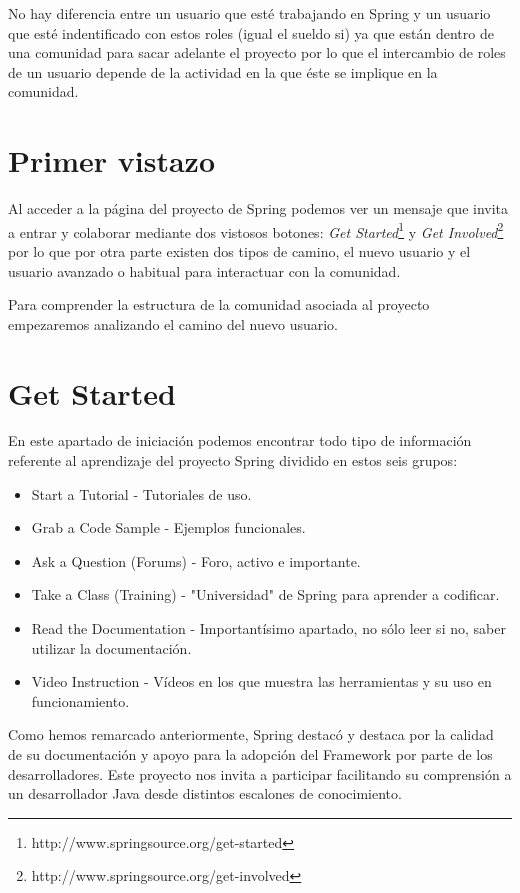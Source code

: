 \documentclass[11pt]{scrartcl}
\begin{document}
No hay diferencia entre un usuario que esté trabajando en Spring y un usuario que esté indentificado con estos roles (igual el sueldo si) ya que están dentro de una comunidad para sacar adelante el proyecto por lo que el intercambio de roles de un usuario depende de la actividad en la que éste se implique en la comunidad.

\section{Primer vistazo}

Al acceder a la página del proyecto de Spring podemos ver un mensaje que invita a entrar y colaborar mediante dos vistosos botones: \emph{Get Started}\footnote{http://www.springsource.org/get-started} y \emph{Get Involved}\footnote{http://www.springsource.org/get-involved} por lo que por otra parte existen dos tipos de camino, el nuevo usuario y el usuario avanzado o habitual para interactuar con la comunidad.

Para comprender la estructura de la comunidad asociada al proyecto empezaremos analizando el camino del nuevo usuario.

\section{Get Started}

En este apartado de iniciación podemos encontrar todo tipo de información referente al aprendizaje del proyecto Spring dividido en estos seis grupos:

\begin{itemize}
    \item Start a Tutorial - Tutoriales de uso.
    \item Grab a Code Sample - Ejemplos funcionales.
    \item Ask a Question (Forums) - Foro, activo e importante.
    \item Take a Class (Training) - "Universidad" de Spring para aprender a codificar.
    \item Read the Documentation - Importantísimo apartado, no sólo leer si no, saber utilizar la documentación.
    \item Video Instruction - Vídeos en los que muestra las herramientas y su uso en funcionamiento.
\end{itemize}

Como hemos remarcado anteriormente, Spring destacó y destaca por la calidad de su documentación y apoyo para la adopción del Framework por parte de los desarrolladores.
Este proyecto nos invita a participar facilitando su comprensión a un desarrollador Java desde distintos escalones de conocimiento.
\end{document}
